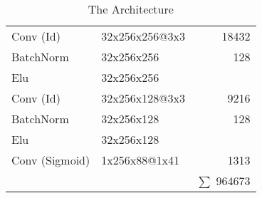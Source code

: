 \begin{table}[htp]
{\begin{tabular}{llr}
	Conv (Id)            & 32x256x256@3x3  & 18432           \\ 
	BatchNorm            & 32x256x256      & 128             \\ 
	Elu                  & 32x256x256      &                 \\ 
	Conv (Id)            & 32x256x128@3x3  & 9216            \\ 
	BatchNorm            & 32x256x128      & 128             \\ 
	Elu                  & 32x256x128      &                 \\ 
	Conv (Sigmoid)       & 1x256x88@1x41   & 1313            \\ 
\hline
	                     &                 & $\sum$ 964673  
\end{tabular}%
}
\caption{The \AUNet Architecture}
\label{table:aunet}
\end{table}

